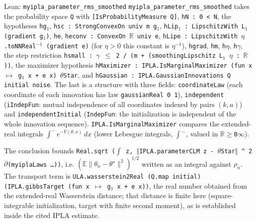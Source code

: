 \documentclass[11pt,a4paper]{article}
\begin{document}
\begin{leanbox}{Lean: \texttt{myipla\_\allowbreak{}parameter\_\allowbreak{}rms\_\allowbreak{}smoothed}}
\texttt{myipla\_\allowbreak{}parameter\_\allowbreak{}rms\_\allowbreak{}smoothed} takes the probability space \texttt{Q} with \texttt{[Is\allowbreak{}Probability\allowbreak{}Measure Q]}, \texttt{h\allowbreak{}N : 0 < N}, the hypotheses \texttt{hg\ensuremath{{}_{1}}}, \texttt{hsc : Strong\allowbreak{}Convex\allowbreak{}On univ m g\ensuremath{{}_{1}}}, \texttt{h\allowbreak{}Lip\ensuremath{{}_{1}} : Lipschitz\allowbreak{}With L\ensuremath{{}_{1}} (gradient g\ensuremath{{}_{1}})}, \texttt{he}, \texttt{heconv : Convex\allowbreak{}On \ensuremath{\mathbb R} univ e}, \texttt{h\allowbreak{}Lipe : Lipschitz\allowbreak{}With \ensuremath{\eta}.\allowbreak{}to\allowbreak{}NNReal\ensuremath{{}^{-1}} (gradient e)} (for \(\eta>0\) this constant is \(\eta^{-1}\)), \texttt{hgrad}, \texttt{hm}, \texttt{h\ensuremath{\eta}}, \texttt{h\ensuremath{\gamma}}, the step restriction \texttt{hsmall : \ensuremath{\gamma} \ensuremath{\le} 2 /\allowbreak{} (m + (smoothing\allowbreak{}Lipschitz L\ensuremath{{}_{1}} \ensuremath{\eta} : \ensuremath{\mathbb R}))}, the maximizer hypothesis \texttt{h\allowbreak{}Maximizer : IPLA.\allowbreak{}Is\allowbreak{}Marginal\allowbreak{}Maximizer (fun x \ensuremath{\mapsto} g\ensuremath{{}_{1}} x + e x) \ensuremath{\theta}\allowbreak{}Star}, and \texttt{h\allowbreak{}Gaussian : IPLA.\allowbreak{}Gaussian\allowbreak{}Innovations Q initial noise}. The last is a structure with three fields: \texttt{coordinate\allowbreak{}Law} (each coordinate of each innovation has law \texttt{gaussian\allowbreak{}Real 0 1}), \texttt{independent} (\texttt{i\allowbreak{}Indep\allowbreak{}Fun}: mutual independence of all coordinates indexed by pairs \((k,a)\)) and \texttt{independent\allowbreak{}Initial} (\texttt{Indep\allowbreak{}Fun}: the initialization is independent of the whole innovation sequence). \texttt{IPLA.\allowbreak{}Is\allowbreak{}Marginal\allowbreak{}Maximizer} compares the extended-real integrals \(\int^-e^{-V(\theta,x)}\,dx\) (lower Lebesgue integrals, \texttt{\ensuremath{\int}\ensuremath{{}^{-}}}, valued in \texttt{\ensuremath{\mathbb R}\ensuremath{\ge}0\ensuremath{\infty}}).




The conclusion bounds \texttt{Real.\allowbreak{}sqrt (\ensuremath{\int} z, \ensuremath{\Vert}IPLA.\allowbreak{}parameter\allowbreak{}CLM z -\allowbreak{} \ensuremath{\theta}\allowbreak{}Star\ensuremath{\Vert} \textasciicircum{} 2 \ensuremath{\partial}(myipla\allowbreak{}Laws …))}, i.e. \((\mathbb E\|\theta_n-\theta^\star\|^2)^{1/2}\) written as an integral against \(\rho_n\). The transport term is \texttt{ULA.\allowbreak{}wasserstein2\allowbreak{}Real (Q.\allowbreak{}map initial) (IPLA.\allowbreak{}gibbs\allowbreak{}Target (fun x \ensuremath{\mapsto} g\ensuremath{{}_{1}} x + e x))}, the real number obtained from the extended-real Wasserstein distance; that distance is finite here (square-integrable initialization, target with finite second moment), as is established inside the cited IPLA estimate.





\end{leanbox}
\end{document}
